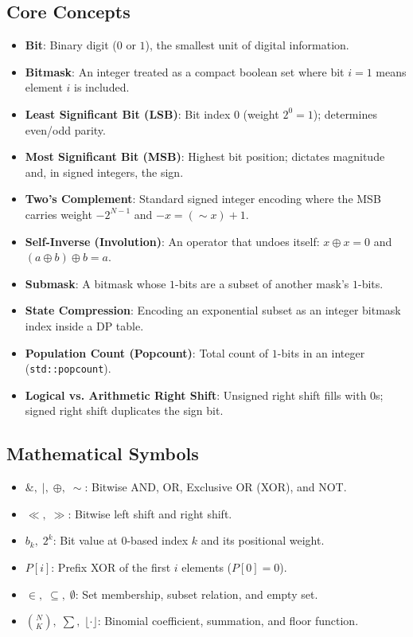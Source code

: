 \documentclass[11pt,a4paper]{article}
\theoremstyle{definition}
\begin{document}
\subsection*{Core Concepts}
\begin{itemize}
    \item \textbf{Bit}: Binary digit ($0$ or $1$), the smallest unit of digital information.
    \item \textbf{Bitmask}: An integer treated as a compact boolean set where bit $i = 1$ means element $i$ is included.
    \item \textbf{Least Significant Bit (LSB)}: Bit index $0$ (weight $2^0 = 1$); determines even/odd parity.
    \item \textbf{Most Significant Bit (MSB)}: Highest bit position; dictates magnitude and, in signed integers, the sign.
    \item \textbf{Two's Complement}: Standard signed integer encoding where the MSB carries weight $-2^{N-1}$ and $-x = (\sim x) + 1$.
    \item \textbf{Self-Inverse (Involution)}: An operator that undoes itself: $x \oplus x = 0$ and $(a \oplus b) \oplus b = a$.
    \item \textbf{Submask}: A bitmask whose $1$-bits are a subset of another mask's $1$-bits.
    \item \textbf{State Compression}: Encoding an exponential subset as an integer bitmask index inside a DP table.
    \item \textbf{Population Count (Popcount)}: Total count of $1$-bits in an integer (\texttt{std::popcount}).
    \item \textbf{Logical vs. Arithmetic Right Shift}: Unsigned right shift fills with $0$s; signed right shift duplicates the sign bit.
\end{itemize}

\subsection*{Mathematical Symbols}
\begin{itemize}
    \item $\mathbin{\&},\; \mid,\; \oplus,\; \sim$: Bitwise AND, OR, Exclusive OR (XOR), and NOT.
    \item $\ll,\; \gg$: Bitwise left shift and right shift.
    \item $b_k,\; 2^k$: Bit value at 0-based index $k$ and its positional weight.
    \item $P[i]$: Prefix XOR of the first $i$ elements ($P[0] = 0$).
    \item $\in,\; \subseteq,\; \emptyset$: Set membership, subset relation, and empty set.
    \item $\binom{N}{K},\; \sum,\; \lfloor \cdot \rfloor$: Binomial coefficient, summation, and floor function.
\end{itemize}
\end{document}

